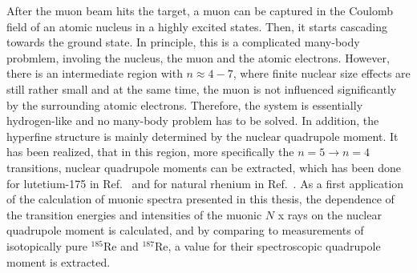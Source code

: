 After the muon beam hits the target, a muon can be captured in the Coulomb field of an atomic nucleus in a highly excited states. Then, it starts cascading towards the ground state. In principle, this is a complicated many-body probmlem, involing the nucleus, the muon and the atomic electrons. However, there is an intermediate region with $n\approx 4 - 7$, where finite nuclear size effects are still rather small and at the same time, the muon is not influenced significantly by the surrounding atomic electrons. Therefore, the system is essentially hydrogen-like and no many-body problem has to be solved. In addition, the hyperfine structure is mainly determined by the nuclear quadrupole moment. It has been realized, that in this region, more specifically the ${n}{=}{5}\rightarrow{n}{=}{4}$ transitions, nuclear quadrupole moments can be extracted, which has been done for lutetium-175 in Ref.~\cite{Dey1979} and for natural rhenium in Ref.~\cite{konijn1979}.
As a first application of the calculation of muonic spectra presented in this thesis, the dependence of the transition energies and intensities of the muonic $N$ x rays on the nuclear quadrupole moment is calculated, and by comparing to measurements of isotopically pure $^{185}$Re and $^{187}$Re, a value for their spectroscopic quadrupole moment is extracted.

